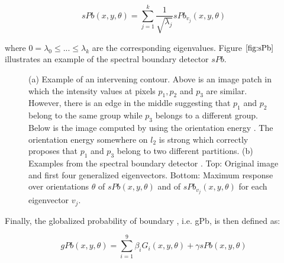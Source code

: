 \documentclass{SMBV13}
\begin{document}
\begin{equation}
sPb(x, y, \theta) = \sum\limits_{j=1}^{k}\dfrac{1}{\sqrt{\lambda_j}}sPb_{v_j}(x, y, \theta)
\end{equation}

where $0 = \lambda_0 \leq ... \leq \lambda_k$ are the corresponding eigenvalues. Figure $\ref{fig:sPb}$ illustrates an example of the spectral boundary detector $sPb$.

\begin{figure}[htbp]
    \centering
    \caption{(a) Example of an intervening contour. Above is an image patch in which the intensity values at pixels $p_1, p_2$ and $p_3$ are similar. However, there is an edge in the middle suggesting that $p_1$ and $p_2$ belong to the same group while $p_3$ belongs to a different group. Below is the image computed by using the orientation energy \cite{leung1998contour}. The orientation energy somewhere on $l_2$ is strong which correctly proposes that $p_1$ and $p_3$ belong to two different partitions. (b) Examples from the spectral boundary detector \cite{maire2008using}. Top: Original image and first four generalized eigenvectors. Bottom: Maximum response over orientations $\theta$ of $sPb(x, y, \theta)$ and of $sPb_{v_j}(x, y, \theta)$ for each eigenvector $v_j$.}
\end{figure}

Finally, the globalized probability of boundary , i.e. gPb, is then defined as:

\begin{equation}
gPb(x, y, \theta) = \sum\limits_{i = 1}^{9}\beta_i G_i(x, y, \theta) + \gamma sPb(x, y, \theta)
\end{equation}
\end{document}
